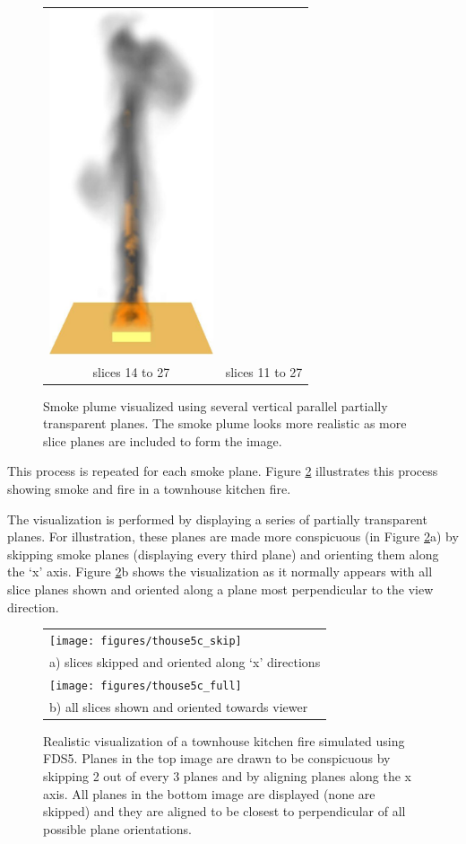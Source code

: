 \begin{figure}[\figoptions]
\begin{center}
\begin{tabular}{cc}
\includegraphics[height=4.0in]{figures/splume_11_27}\\
slices 14 to 27&slices 11 to 27
\end{tabular}
\end{center}
\caption [Smoke plume visualized using several vertical parallel
partially transparent planes.] {Smoke plume visualized using
several vertical parallel partially transparent planes. The smoke
plume looks more realistic as more slice planes
are included to form the image. } \label{figplume}
\end{figure}

\noindent This process is repeated for each smoke plane. Figure
\ref{figsmoke3d} illustrates this process showing smoke and fire
in a townhouse kitchen fire.

The visualization is performed by displaying a series of partially
transparent planes. For illustration, these planes are made more
conspicuous (in Figure \ref{figsmoke3d}a) by skipping smoke planes
(displaying every third plane) and orienting them along the `x'
axis. Figure \ref{figsmoke3d}b shows the visualization as it
normally appears with all slice planes shown and oriented along a
plane most perpendicular to the view direction.
\begin{figure}[\figoptions]
\begin{center}
\begin{tabular}{l}
\texttt{[image: figures/thouse5c\_skip]}\\
a) slices skipped and oriented along `x' directions\\
\texttt{[image: figures/thouse5c\_full]}\\
b) all slices shown and oriented towards viewer \\
\end{tabular}
\end{center}
\caption{Realistic visualization of a townhouse kitchen fire simulated
using FDS5. Planes in the top image are drawn to be conspicuous by
skipping 2 out of every 3 planes and by aligning planes along the
x axis. All planes in the bottom image are displayed (none are
skipped) and they are aligned to be closest to perpendicular of
all possible plane orientations.
  }
\label{figsmoke3d}%
\end{figure}

